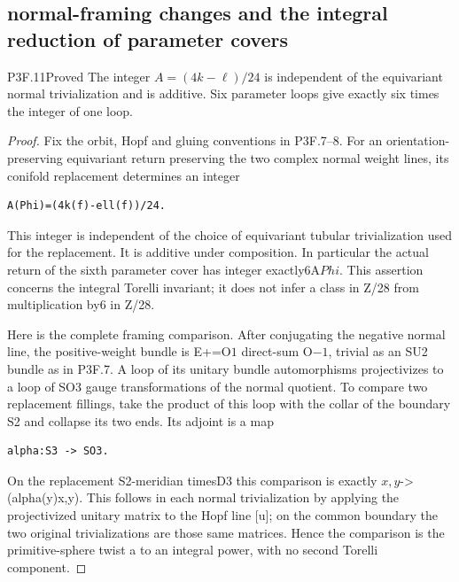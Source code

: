\subsection{normal-framing changes and the integral reduction of parameter covers}
\begin{statement}{P3F.11}{Proved}
The integer $A=(4k-\ell)/24$ is independent of the equivariant normal trivialization and is additive. Six parameter loops give exactly six times the integer of one loop.
\end{statement}
\begin{proof}
Fix the orbit, Hopf and gluing conventions in P3F.7--8. For an orientation-preserving equivariant return preserving the two complex normal weight lines, its conifold replacement determines an integer

\begin{lstlisting}
A(Phi)=(4k(f)-ell(f))/24.
\end{lstlisting}

This integer is independent of the choice of equivariant tubular trivialization used for the replacement. It is additive under composition. In particular the actual return of the sixth parameter cover has integer exactly6A\(Phi\). This assertion concerns the integral Torelli invariant; it does not infer a class in Z/28 from multiplication by6 in Z/28.

Here is the complete framing comparison. After conjugating the negative normal line, the positive-weight bundle is E+=O\(1\) direct-sum O\(-1\), trivial as an SU2 bundle as in P3F.7. A loop of its unitary bundle automorphisms projectivizes to a loop of SO3 gauge transformations of the normal quotient. To compare two replacement fillings, take the product of this loop with the collar of the boundary S2 and collapse its two ends. Its adjoint is a map

\begin{lstlisting}
alpha:S3 -> SO3.
\end{lstlisting}

On the replacement S2-meridian timesD3 this comparison is exactly \(x,y\)-\textgreater(alpha(y)x,y). This follows in each normal trivialization by applying the projectivized unitary matrix to the Hopf line {[}u{]}; on the common boundary the two original trivializations are those same matrices. Hence the comparison is the primitive-sphere twist a to an integral power, with no second Torelli component.


\end{proof}
